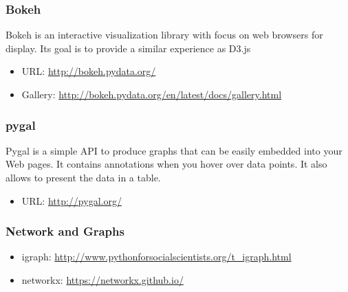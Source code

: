 \subsubsection{Bokeh}
\label{\detokenize{lesson/prg/python_big_data:bokeh}}
Bokeh is an interactive visualization library with focus on
web browsers for display. Its goal is to provide a similar experience
as D3.js
\begin{itemize}
\item {} 
URL: \url{http://bokeh.pydata.org/}

\item {} 
Gallery: \url{http://bokeh.pydata.org/en/latest/docs/gallery.html}

\end{itemize}


\subsubsection{pygal}
\label{\detokenize{lesson/prg/python_big_data:pygal}}
Pygal is a simple API to produce graphs that can be easily
embedded into your Web pages. It contains annotations when you hover
over data points. It also allows to present the data in a table.
\begin{itemize}
\item {} 
URL: \url{http://pygal.org/}

\end{itemize}


\subsubsection{Network and Graphs}
\label{\detokenize{lesson/prg/python_big_data:network-and-graphs}}\begin{itemize}
\item {} 
igraph: \url{http://www.pythonforsocialscientists.org/t\_igraph.html}

\item {} 
networkx: \url{https://networkx.github.io/}

\end{itemize}



